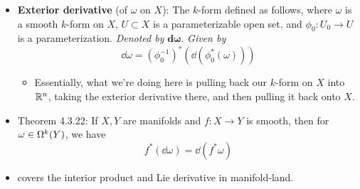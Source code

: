 \documentclass[../notes.tex]{subfiles}
\begin{document}
\begin{itemize}
    \item \textbf{Exterior derivative} (of $\omega$ on $X$): The $k$-form defined as follows, where $\omega$ is a smooth $k$-form on $X$, $U\subset X$ is a parameterizable open set, and $\phi_0:U_0\to U$ is a parameterization. \emph{Denoted by} $\bm{\textbf{d}\omega}$. \emph{Given by}
    \begin{equation*}
        \dd\omega = (\phi_0^{-1})^*(\dd(\phi_0^*(\omega)))
    \end{equation*}
    \begin{itemize}
        \item Essentially, what we're doing here is pulling back our $k$-form on $X$ into $\R^n$, taking the exterior derivative there, and then pulling it back onto $X$.
    \end{itemize}
    \item Theorem 4.3.22: If $X,Y$ are manifolds and $f:X\to Y$ is smooth, then for $\omega\in\ome[k]{Y}$, we have
    \begin{equation*}
        f^*(\dd\omega) = \dd(f^*\omega)
    \end{equation*}
    \item \textcite{bib:DifferentialForms} covers the interior product and Lie derivative in manifold-land.
\end{itemize}
\end{document}
